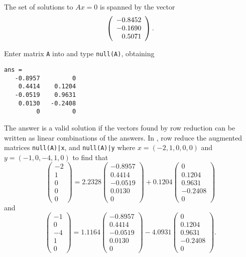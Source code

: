 \documentclass{ximera}
\begin{document}
 The set of solutions to $Ax = 0$ is spanned by the vector
\[
\left(\begin{array}{r} -0.8452 \\ -0.1690 \\ 0.5071\end{array}\right).
\]

\newpage
{}
Enter matrix {\tt A} into \Matlab and type {\tt null(A)}, obtaining
\begin{verbatim}
ans =
   -0.8957         0
    0.4414    0.1204
   -0.0519    0.9631
    0.0130   -0.2408
         0         0
\end{verbatim}
The \Matlab answer is a valid solution if the vectors found
by row reduction can be written as linear combinations of the \Matlab
answers.  In \Matlab, row reduce the augmented matrices {\tt null(A)|x},
and {\tt null(A)|y} where $x = (-2,1,0,0,0)$ and $y = (-1,0,-4,1,0)$ 
to find that
\[
\left(\begin{array}{r} -2 \\ 1 \\ 0 \\ 0 \\ 0 \end{array}\right) =
2.2328\left(\begin{array}{r} -0.8957 \\ 0.4414 \\ -0.0519 \\ 0.0130 \\ 0
\end{array}\right) + 0.1204\left(\begin{array}{r} 0 \\ 0.1204 \\ 0.9631 \\
-0.2408 \\ 0 \end{array}\right)
\]
and
\[
\left(\begin{array}{r} -1 \\ 0 \\ -4 \\ 1 \\ 0 \end{array}\right) =
1.1164\left(\begin{array}{r} -0.8957 \\ 0.4414 \\ -0.0519 \\ 0.0130 \\ 0
\end{array}\right) - 4.0931\left(\begin{array}{r} 0 \\ 0.1204 \\ 0.9631 \\
-0.2408 \\ 0 \end{array}\right).
\]
\end{document}

